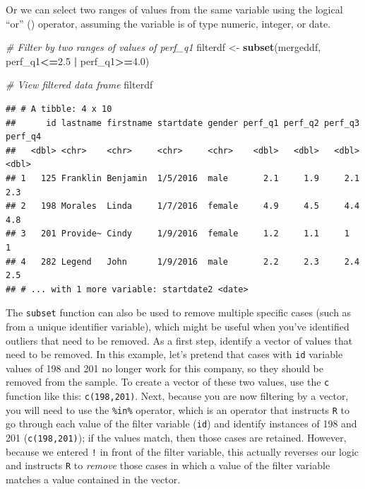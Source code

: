 \documentclass[]{book}
\newenvironment{Shaded}{\begin{snugshade}}{\end{snugshade}}
\newcommand{\KeywordTok}[1]{\textcolor[rgb]{0.13,0.29,0.53}{\textbf{#1}}}
\newcommand{\FloatTok}[1]{\textcolor[rgb]{0.00,0.00,0.81}{#1}}
\newcommand{\StringTok}[1]{\textcolor[rgb]{0.31,0.60,0.02}{#1}}
\newcommand{\CommentTok}[1]{\textcolor[rgb]{0.56,0.35,0.01}{\textit{#1}}}
\newcommand{\OperatorTok}[1]{\textcolor[rgb]{0.81,0.36,0.00}{\textbf{#1}}}
\newcommand{\NormalTok}[1]{#1}
\begin{document}
Or we can select two ranges of values from the same variable using the
logical ``or'' (\texttt{\textbar{}}) operator, assuming the variable is
of type numeric, integer, or date.

\begin{Shaded}
\begin{Highlighting}[]
\CommentTok{# Filter by two ranges of values of perf_q1}
\NormalTok{filterdf <-}\StringTok{ }\KeywordTok{subset}\NormalTok{(mergeddf, perf_q1}\OperatorTok{<=}\FloatTok{2.5} \OperatorTok{|}\StringTok{ }\NormalTok{perf_q1}\OperatorTok{>=}\FloatTok{4.0}\NormalTok{)}

\CommentTok{# View filtered data frame}
\NormalTok{filterdf}
\end{Highlighting}
\end{Shaded}

\begin{verbatim}
## # A tibble: 4 x 10
##      id lastname firstname startdate gender perf_q1 perf_q2 perf_q3 perf_q4
##   <dbl> <chr>    <chr>     <chr>     <chr>    <dbl>   <dbl>   <dbl>   <dbl>
## 1   125 Franklin Benjamin  1/5/2016  male       2.1     1.9     2.1     2.3
## 2   198 Morales  Linda     1/7/2016  female     4.9     4.5     4.4     4.8
## 3   201 Provide~ Cindy     1/9/2016  female     1.2     1.1     1       1  
## 4   282 Legend   John      1/9/2016  male       2.2     2.3     2.4     2.5
## # ... with 1 more variable: startdate2 <date>
\end{verbatim}

The \texttt{subset} function can also be used to remove multiple
specific cases (such as from a unique identifier variable), which might
be useful when you've identified outliers that need to be removed. As a
first step, identify a vector of values that need to be removed. In this
example, let's pretend that cases with \texttt{id} variable values of
198 and 201 no longer work for this company, so they should be removed
from the sample. To create a vector of these two values, use the
\texttt{c} function like this: \texttt{c(198,201)}. Next, because you
are now filtering by a vector, you will need to use the \texttt{\%in\%}
operator, which is an operator that instructs \texttt{R} to go through
each value of the filter variable (\texttt{id}) and identify instances
of 198 and 201 (\texttt{c(198,201)}); if the values match, then those
cases are retained. However, because we entered \texttt{!} in front of
the filter variable, this actually reverses our logic and instructs
\texttt{R} to \emph{remove} those cases in which a value of the filter
variable matches a value contained in the vector.
\end{document}
